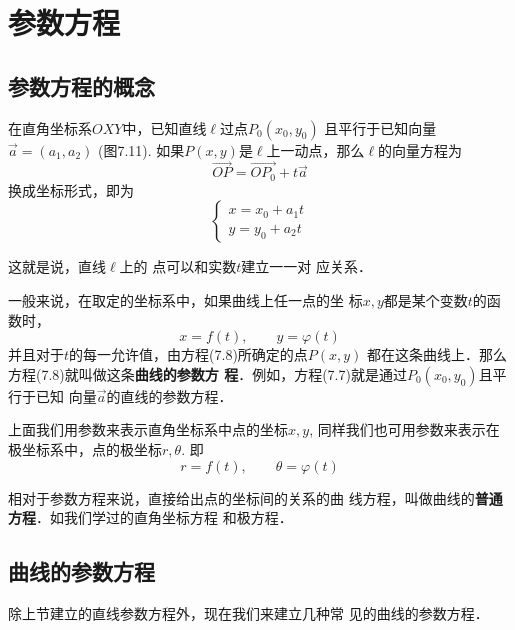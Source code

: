 \section{参数方程}

\subsection{参数方程的概念}
在直角坐标系$OXY$中，已知直线$\ell$过点$P_0(x_0,y_0)$
且平行于已知向量$\vec{a}=(a_1,a_2)$ (图7.11). 如果$P(x,
y)$是$\ell$上一动点，那么$\ell$的向量方程为
\[\Vec{OP}=\Vec{OP_0}+t\vec{a}\]
换成坐标形式，即为
\begin{equation}
    \begin{cases}
        x=x_0+a_1t\\
        y=y_0+a_2t
    \end{cases}
\end{equation}


\begin{figure}[htp]
    \centering
{}
    \caption{}
\end{figure}


这就是说，直线$\ell$上的
点可以和实数$t$建立一一对
应关系．

一般来说，在取定的坐标系中，如果曲线上任一点的坐
标$x,y$都是某个变数$t$的函数时，
\begin{equation}
    x=f(t),\qquad y=\varphi(t)
\end{equation}
并且对于$t$的每一允许值，由方程(7.8)所确定的点$P(x,y)$
都在这条曲线上．那么方程(7.8)就叫做这条\textbf{曲线的参数方
程}．例如，方程(7.7)就是通过$P_0(x_0,y_0)$且平行于已知
向量$\vec{a}$的直线的参数方程．

上面我们用参数来表示直角坐标系中点的坐标$x,y$, 
同样我们也可用参数来表示在极坐标系中，点的极坐标$r,
\theta$. 即
\[  r=f(t),\qquad \theta=\varphi(t)\]

相对于参数方程来说，直接给出点的坐标间的关系的曲
线方程，叫做曲线的\textbf{普通方程}．如我们学过的直角坐标方程
和极方程．

\subsection{曲线的参数方程}
除上节建立的直线参数方程外，现在我们来建立几种常
见的曲线的参数方程．

